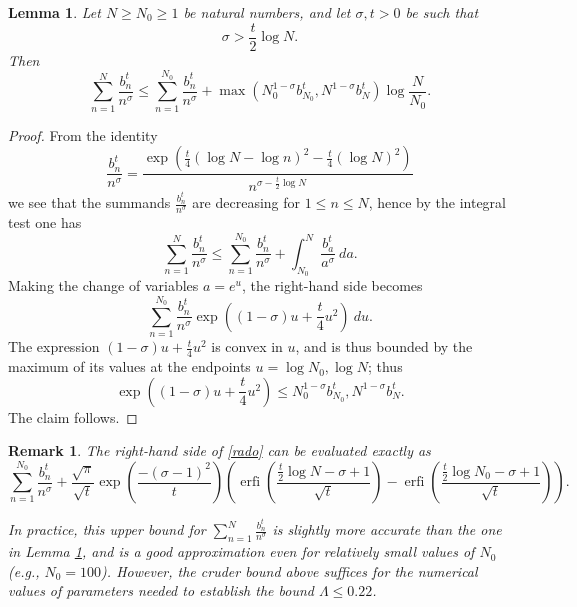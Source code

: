 \documentclass[a4paper,11pt,twoside]{amsart}
\newtheorem{lemma}[theorem]{Lemma}
\newtheorem{remark}[theorem]{Remark}
\begin{document}
\begin{lemma}\label{largen}
Let $N \geq N_0 \geq 1$ be natural numbers, and let $\sigma,t > 0$ be such that
$$ \sigma > \frac{t}{2} \log N.$$
Then
$$ \sum_{n=1}^N \frac{b_n^t}{n^\sigma} \leq \sum_{n=1}^{N_0}
\frac{b_n^t}{n^\sigma}  + 
\max( N_0^{1-\sigma} b_{N_0}^t, N^{1-\sigma} b_N^t ) \log \frac{N}{N_0}.$$
\end{lemma}

\begin{proof}  From the identity
$$ \frac{b_n^t}{n^\sigma} = \frac{\exp\left( \frac{t}{4} (\log N - \log n)^2 - \frac{t}{4} (\log N)^2\right) }{n^{\sigma - \frac{t}{2} \log N}}$$
we see that the summands $\frac{b_n^t}{n^\sigma}$ are decreasing for $1 \leq n \leq N$, hence by the integral test one has
\begin{equation}\label{rado}
 \sum_{n=1}^N \frac{b_n^t}{n^\sigma} \leq \sum_{n=1}^{N_0}
\frac{b_n^t}{n^\sigma}  + \int_{N_0}^N \frac{b_a^t}{a^\sigma}\ da.
\end{equation}
Making the change of variables $a = e^u$, the right-hand side becomes
$$\sum_{n=1}^{N_0} \frac{b_n^t}{n^\sigma} \exp( (1-\sigma) u + \frac{t}{4} u^2 )\ du.$$
The expression $(1-\sigma) u + \frac{t}{4} u^2$ is convex in $u$, and is thus bounded by the maximum of its values at the endpoints $u = \log N_0, \log N$; thus
$$\exp( (1-\sigma) u + \frac{t}{4} u^2) \leq N_0^{1-\sigma} b_{N_0}^t, N^{1-\sigma} b_N^t.$$
The claim follows. 
\end{proof}

\begin{remark}  The right-hand side of \eqref{rado} can be evaluated exactly as
$$
\sum_{n=1}^{N_0}
\frac{b_n^t}{n^\sigma}  + \frac{\sqrt \pi}{\sqrt t} \exp(\frac{-(\sigma - 1)^2}{t}) \left( \operatorname{erfi}\left(\frac{\frac{t}{2} \log N  - \sigma + 1}{\sqrt t} \right) - \operatorname{erfi}\left(\frac{\frac{t}{2} \log N_0  - \sigma + 1}{\sqrt t}\right) \right).$$

In practice, this upper bound for $\sum_{n=1}^N \frac{b_n^t}{n^\sigma}$ is slightly more accurate than the one in Lemma \ref{largen}, and is a good approximation even for relatively small values of $N_0$ (e.g., $N_0=100$).  However, the cruder bound above suffices for the numerical values of parameters needed to establish the bound $\Lambda \leq 0.22$.
\end{remark}
\end{document}
